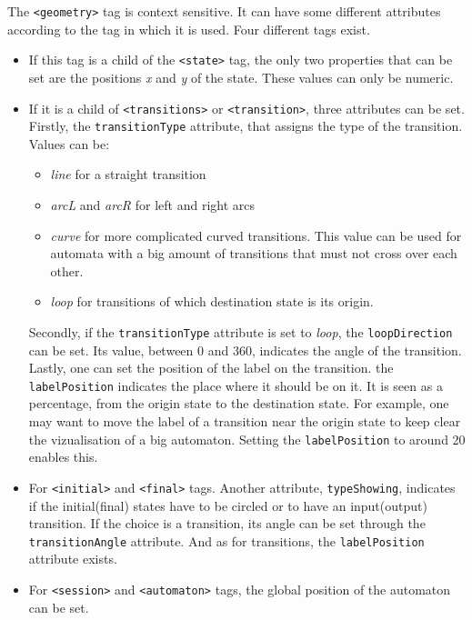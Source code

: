 \documentclass[a4paper]{article}
\newcommand{\xtag}[1]{\texttt{<#1>}}
\newcommand{\xattr}[1]{\texttt{#1}}
\begin{document}
The \xtag{geometry} tag is context sensitive. It can have some different
attributes according to the tag in which it is used. Four different tags exist.
\begin{itemize}
\item If this tag is a child of the \xtag{state} tag, the only two properties
  that can be set are the positions \textit{x} and \textit{y} of the state.
  These values can only be numeric.

\item If it is a child of \xtag{transitions} or \xtag{transition},
  three attributes can be set. Firstly, the \xattr{transitionType}
  attribute, that assigns the type of the transition. Values can be:
  \begin{itemize}
  \item \textit{line} for a straight transition
  \item \textit{arcL} and \textit{arcR} for left and right arcs
  \item \textit{curve} for more complicated curved transitions. This value can
    be used for automata with a big amount of transitions that must not cross
    over each other.
  \item \textit{loop} for transitions of which destination state is its origin.
  \end{itemize}
  Secondly, if the \xattr{transitionType} attribute is set to \textit{loop}, the
  \xattr{loopDirection} can be set. Its value, between 0 and 360, indicates
  the angle of the transition.\\ Lastly, one can set the position of the label
  on the transition. the \xattr{labelPosition} indicates the place where it
  should be on it. It is seen as a percentage, from the origin state to
  the destination state.  For example, one may want to move the label of a
  transition near the origin state to keep clear the vizualisation of a big
  automaton. Setting the \xattr{labelPosition} to around 20 enables this.

\item For \xtag{initial} and \xtag{final} tags. Another attribute,
  \xattr{typeShowing}, indicates if the initial(final) states have to be circled
  or to have an input(output) transition. If the choice is a transition, its
  angle can be set through the \xattr{transitionAngle} attribute. And as for
  transitions, the \xattr{labelPosition} attribute exists.

\item For \xtag{session} and \xtag{automaton} tags, the global position of the
  automaton can be set.
\end{itemize}
\end{document}
